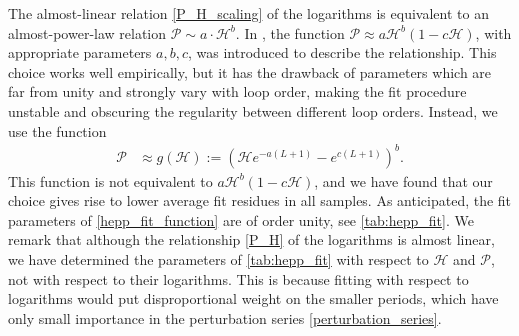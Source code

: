 \documentclass[11pt,a4paper]{article}
\newcommand{\period}{\mathcal P}
\renewcommand{\|}{\rule[-0.4ex]{0.2ex}{1.2em}}
\begin{document}
The almost-linear relation \cref{P_H_scaling} of the logarithms is equivalent to an almost-power-law relation $\period \sim a \cdot \mathcal H^b$. In  \cite{kompaniets_minimally_2017}, the function $\period \approx a \mathcal H^b (1-c\mathcal H )$, with appropriate parameters $a,b,c$, was introduced to describe the relationship. This choice works well empirically, but it has the drawback of parameters which are far from unity and strongly vary with loop order, making the fit procedure unstable and obscuring the regularity  between different loop orders. Instead, we use the function
\begin{align}\label{hepp_fit_function}
\period &\approx g(\mathcal H) := \left( \mathcal H e^{-a(L+1)} - e^{c(L+1)} \right) ^b.
\end{align}
This function is not equivalent to $a \mathcal H^b (1-c\mathcal H )$, and we have found that our choice gives rise to lower average fit residues in all  samples.  As anticipated, the fit parameters of \cref{hepp_fit_function} are of order unity, see \cref{tab:hepp_fit}. 
We remark that although the relationship \cref{P_H} of the logarithms is almost linear, we have determined the parameters of \cref{tab:hepp_fit} with respect to $\mathcal H$ and $\period$, not with respect to their logarithms. This is because fitting with respect to logarithms would put disproportional weight on the smaller periods, which have only small importance in the perturbation series \cref{perturbation_series}.
\end{document}
